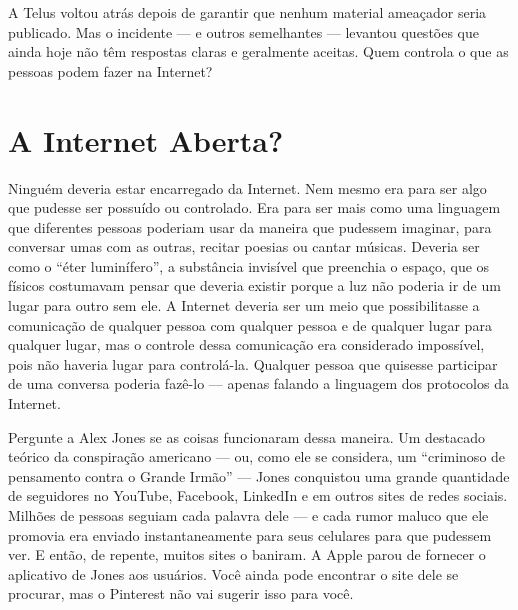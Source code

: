 A Telus voltou atrás depois de garantir que nenhum material ameaçador seria
publicado. Mas o incidente --- e outros semelhantes --- levantou questões que ainda
hoje não têm respostas claras e geralmente aceitas. Quem controla o que as pessoas
podem fazer na Internet?

\section{A Internet Aberta?}
\label{gatekeepers:internet-aberta}

Ninguém deveria estar encarregado da Internet. Nem mesmo era para ser algo que
pudesse ser possuído ou controlado. Era para ser mais como uma linguagem que
diferentes pessoas poderiam usar da maneira que pudessem imaginar, para conversar umas
com as outras, recitar poesias ou cantar músicas. Deveria ser como o ``éter luminífero'',
a substância invisível que preenchia o espaço, que os físicos costumavam pensar que
deveria existir porque a luz não poderia ir de um lugar para outro sem ele. A Internet
deveria ser um meio que possibilitasse a comunicação de qualquer pessoa com qualquer
pessoa e de qualquer lugar para qualquer lugar, mas o controle dessa comunicação era
considerado impossível, pois não haveria lugar para controlá-la. Qualquer pessoa que
quisesse participar de uma conversa poderia fazê-lo --- apenas falando a linguagem
dos protocolos da Internet.

Pergunte a Alex Jones se as coisas funcionaram dessa maneira. Um destacado teórico
da conspiração americano --- ou, como ele se considera, um ``criminoso de pensamento
contra o Grande Irmão'' --- Jones conquistou uma grande quantidade de seguidores no
YouTube, Facebook, LinkedIn e em outros sites de redes sociais. Milhões de pessoas
seguiam cada palavra dele --- e cada rumor maluco que ele promovia era enviado
instantaneamente para seus celulares para que pudessem ver. E então, de repente,
muitos sites o baniram. A Apple parou de fornecer o aplicativo de Jones aos usuários.
Você ainda pode encontrar o site dele se procurar, mas o Pinterest não vai sugerir
isso para você.

